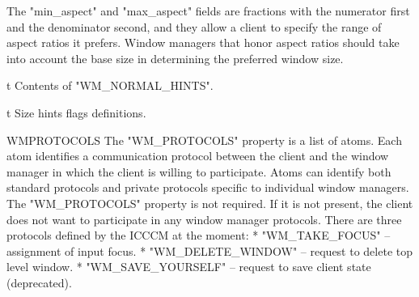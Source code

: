 The "min_aspect" and "max_aspect" fields are fractions with the numerator first and the denominator second, and they allow a client to specify the range of aspect ratios it prefers.
Window managers that honor aspect ratios should take into account the base size in determining the preferred window size.

\midinsert {}
\caption/t Contents of {"WM_NORMAL_HINTS"}.
\endinsert

\midinsert {}
\caption/t Size hints flags definitions.
\endinsert

\heading WM\uns PROTOCOLS
The "WM_PROTOCOLS" property is a list of atoms.
Each atom identifies a communication protocol between the client and the window manager in which the client is willing to participate.
Atoms can identify both standard protocols and private protocols specific to individual window managers.
The "WM_PROTOCOLS" property is not required.
If it is not present, the client does not want to participate in any window manager protocols.
There are three protocols defined by the ICCCM at the moment:
\begitems
* "WM_TAKE_FOCUS" -- assignment of input focus.
* "WM_DELETE_WINDOW" -- request to delete top level window.
* "WM_SAVE_YOURSELF" -- request to save client state (deprecated).
\enditems

